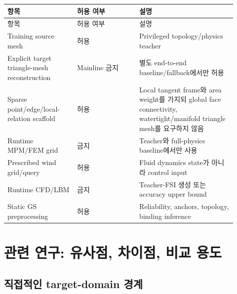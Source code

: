 \documentclass[11pt,a4paper]{article}
\begin{document}
\begin{longtable}{L{0.28\linewidth}L{0.25\linewidth}L{0.39\linewidth}}
\toprule
항목 & 허용 여부 & 설명 \\
\midrule
\endfirsthead
\toprule
항목 & 허용 여부 & 설명 \\
\midrule
\endhead
Training source mesh & 허용 & Privileged topology/physics teacher \\
\addlinespace
Explicit target triangle-mesh reconstruction & Mainline 금지 & 별도 end-to-end baseline/fallback에서만 허용 \\
\addlinespace
Sparse point/edge/local-relation scaffold & 허용 & Local tangent frame와 area weight를 가지되 global face connectivity, watertight/manifold triangle mesh를 요구하지 않음 \\
\addlinespace
Runtime MPM/FEM grid & 금지 & Teacher와 full-physics baseline에서만 사용 \\
\addlinespace
Prescribed wind grid/query & 허용 & Fluid dynamics state가 아니라 control input \\
\addlinespace
Runtime CFD/LBM & 금지 & Teacher-FSI 생성 또는 accuracy upper bound \\
\addlinespace
Static GS preprocessing & 허용 & Reliability, anchors, topology, binding inference \\
\bottomrule
\end{longtable}

\section{관련 연구: 유사점, 차이점, 비교 용도}

\subsection{직접적인 target-domain 경계}
\end{document}
